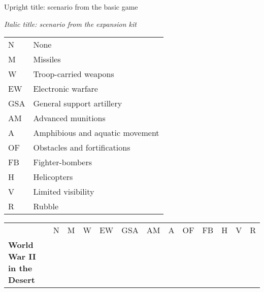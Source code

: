 \documentclass[a4paper]{article}
\newenvironment{texte}{\rmfamily\footnotesize}{}
\begin{document}
\begin{texte}


Upright title: scenario from the basic game

\textit{Italic title: scenario from the expansion kit}

\vspace*{5mm}

\begin{tabular}{ll}
N    &   None                             \\
M    &   Missiles                         \\
W    &   Troop-carried weapons            \\
EW   &   Electronic warfare               \\
GSA  &   General support artillery        \\
AM   &   Advanced munitions               \\
A    &   Amphibious and aquatic movement  \\
OF   &   Obstacles and fortifications     \\
FB   &   Fighter-bombers                  \\
H    &   Helicopters                      \\
V    &   Limited visibility               \\
R    &   Rubble                           \\ 
\end{tabular}

\begin{tabular}{lcccccccccccc}
                                                   & N &  M &  W & EW & GSA & AM & A & OF & FB & H &  V & R \\

\bf World War II in the Desert \\


\end{tabular}
\end{texte}
\end{document}

